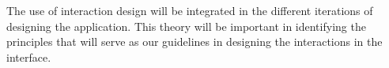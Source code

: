 The use of interaction design will be integrated in the different iterations of designing the application. This theory will be important in identifying the principles that will serve as our guidelines in designing the interactions in the interface.

%





